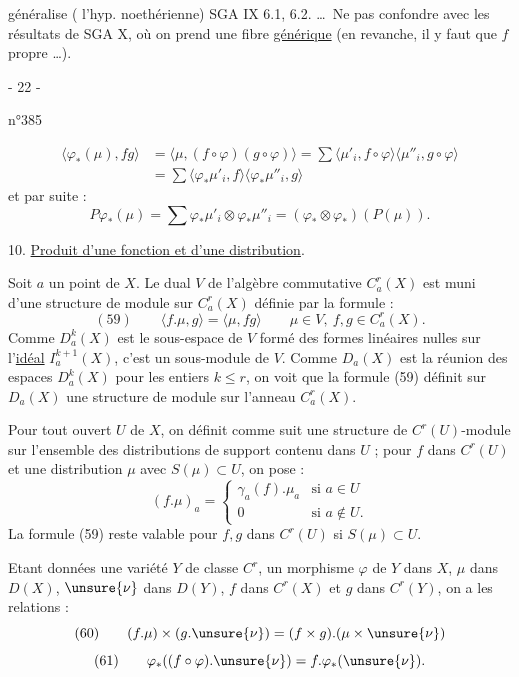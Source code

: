 généralise ( l'hyp. noethérienne)
SGA IX 6.1, 6.2. \ldots\ Ne pas confondre avec les résultats de SGA X, où on prend une fibre %
%
\uline{générique} (en revanche, il y faut  que $f$  propre \ldots).

\begin{center}- 22 -\end{center}
\begin{flushright}n°385\end{flushright}
\[
\begin{aligned}
\langle\varphi_*(\mu),fg\rangle
&=\langle\mu,(f\circ\varphi)(g\circ\varphi)\rangle
=\sum\langle\mu'_i,f\circ\varphi\rangle\langle\mu''_i,g\circ\varphi\rangle\\
&=\sum\langle\varphi_*\mu'_i,f\rangle\langle\varphi_*\mu''_i,g\rangle
\end{aligned}
\]
et par suite :
\[
P\varphi_*(\mu)=\sum\varphi_*\mu'_i\otimes\varphi_*\mu''_i
=(\varphi_*\otimes\varphi_*)(P(\mu)).
\]

10. \uline{Produit d'une fonction et d'une distribution}.

Soit $a$ un point de $X$. Le dual $V$ de l'algèbre commutative $C_a^r(X)$ est muni d'une structure de module sur $C_a^r(X)$ définie par la formule :
\[
(59)\qquad \langle f.\mu,g\rangle=\langle\mu,fg\rangle
\qquad \mu\in V,\ f,g\in C_a^r(X).
\]
Comme $D_a^k(X)$ est le sous-espace de $V$ formé des formes linéaires nulles sur l'\uline{idéal} $I_a^{k+1}(X)$, c'est un sous-module de $V$. Comme $D_a(X)$ est la réunion des espaces $D_a^k(X)$ pour les entiers $k\leq r$, on voit que la formule (59) définit sur $D_a(X)$ une structure de module sur l'anneau $C_a^r(X)$.

Pour tout ouvert $U$ de $X$, on définit comme suit une structure de $C^r(U)$-module sur l'ensemble des distributions de support contenu dans $U$ ; pour $f$ dans $C^r(U)$ et une distribution $\mu$ avec $S(\mu)\subset U$, on pose :
\[
(f.\mu)_a=
\begin{cases}
\gamma_a(f).\mu_a&\text{si }a\in U\\[1ex]
0&\text{si }a\notin U.
\end{cases}
\]
La formule (59) reste valable pour $f,g$ dans $C^r(U)$ si $S(\mu)\subset U$.

Etant données une variété $Y$ de classe $C^r$, un morphisme $\varphi$ de $Y$ dans $X$, $\mu$ dans $D(X)$, $\unsure{\nu}$ dans $D(Y)$, $f$ dans $C^r(X)$ et $g$ dans $C^r(Y)$, on a les relations :
\[
(60)\qquad (f.\mu)\times(g.\unsure{\nu})=(f\times g).(\mu\times\unsure{\nu})
\]
\[
(61)\qquad \varphi_*((f\circ\varphi).\unsure{\nu})=f.\varphi_*(\unsure{\nu}).
\]

